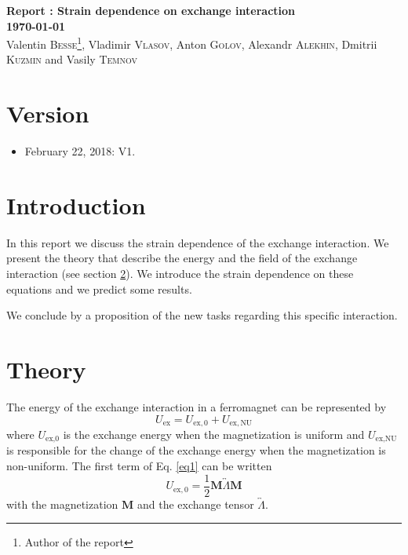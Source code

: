 \documentclass[12pt,a4paper]{article}
\begin{document}
	
	
\begin{center}
	{\bf\Large Report : Strain dependence on exchange interaction}\\
	{\bf\Large \today}\\
	\vspace{0.4cm}
	{\large Valentin \textsc{Besse}\footnote{Author of the report}, Vladimir \textsc{Vlasov}, Anton \textsc{Golov}, Alexandr \textsc{Alekhin}, Dmitrii \textsc{Kuzmin} and Vasily \textsc{Temnov}}\\
	\vspace{0.6cm}
\end{center}
\vspace{0.1cm}

\section*{Version}

\begin{itemize}
    \item February 22, 2018: V1.
\end{itemize}

\section{Introduction}

In this report we discuss the strain dependence of the exchange interaction. 
We present the theory that describe the energy and the field of the exchange interaction (see section \ref{sec1}).
We introduce the strain dependence on these equations and we predict some results.

We conclude by a proposition of the new tasks regarding this specific interaction.

\section{Theory}
\label{sec1}

The energy of the exchange interaction in a ferromagnet can be represented by \cite{gurevich1996magnetization}
\begin{equation}
    U_{\mathrm{ex}} = U_{\mathrm{ex,0}} + U_{\mathrm{ex,NU}}
    \label{eq1}
\end{equation}
where $U_{\textrm{ex,0}}$ is the exchange energy when the magnetization is uniform and $U_{\textrm{ex,NU}}$ is responsible for the change of the exchange energy when the magnetization is non-uniform.
The first term of Eq. \eqref{eq1} can be written
\begin{equation}
    U_{\mathrm{ex,0}} = \frac{1}{2} \mathbf{M} \overleftrightarrow{\Lambda} \mathbf{M}
    \label{eq2}
\end{equation}
with the magnetization $\mathbf{M}$ and the exchange tensor $\overleftrightarrow{\Lambda}$.
\end{document}
